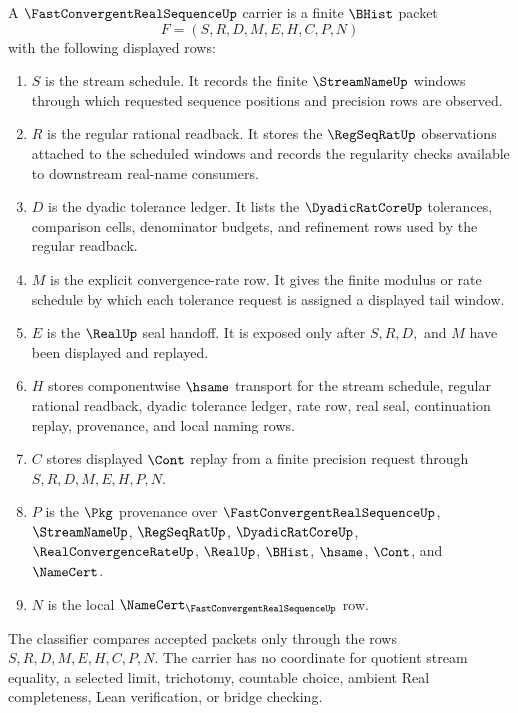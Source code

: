 \begin{definition}
\label{def:fast-convergent-real-sequence-carrier}
A $\FastConvergentRealSequenceUp$ carrier is a finite $\BHist$ packet
$$
F=(S,R,D,M,E,H,C,P,N)
$$
with the following displayed rows:
\begin{enumerate}
\item $S$ is the stream schedule. It records the finite $\StreamNameUp$ windows through which requested sequence positions and precision rows are observed.
\item $R$ is the regular rational readback. It stores the $\RegSeqRatUp$ observations attached to the scheduled windows and records the regularity checks available to downstream real-name consumers.
\item $D$ is the dyadic tolerance ledger. It lists the $\DyadicRatCoreUp$ tolerances, comparison cells, denominator budgets, and refinement rows used by the regular readback.
\item $M$ is the explicit convergence-rate row. It gives the finite modulus or rate schedule by which each tolerance request is assigned a displayed tail window.
\item $E$ is the $\RealUp$ seal handoff. It is exposed only after $S,R,D,$ and $M$ have been displayed and replayed.
\item $H$ stores componentwise $\hsame$ transport for the stream schedule, regular rational readback, dyadic tolerance ledger, rate row, real seal, continuation replay, provenance, and local naming rows.
\item $C$ stores displayed $\Cont$ replay from a finite precision request through $S,R,D,M,E,H,P,N$.
\item $P$ is the $\Pkg$ provenance over $\FastConvergentRealSequenceUp$, $\StreamNameUp$, $\RegSeqRatUp$, $\DyadicRatCoreUp$, $\RealConvergenceRateUp$, $\RealUp$, $\BHist$, $\hsame$, $\Cont$, and $\NameCert$.
\item $N$ is the local $\NameCert_{\FastConvergentRealSequenceUp}$ row.
\end{enumerate}
The classifier compares accepted packets only through the rows $S,R,D,M,E,H,C,P,N$. The carrier has no coordinate for quotient stream equality, a selected limit, trichotomy, countable choice, ambient Real completeness, Lean verification, or bridge checking.
\end{definition}

